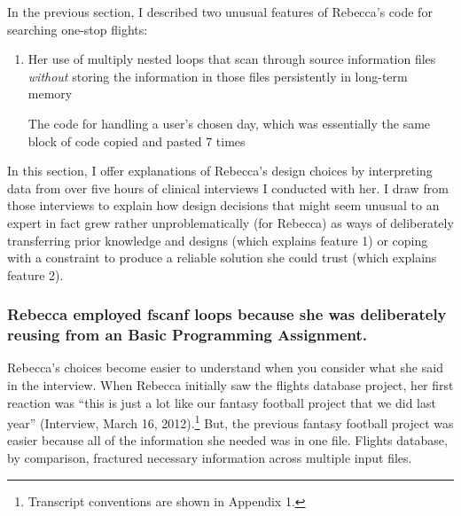 In the previous section, I described two unusual features of Rebecca's code for searching one-stop flights:

\begin{enumerate}
\def\labelenumi{\arabic{enumi}.}
\item
  Her use of multiply nested loops that scan through source information files \emph{without} storing the information in those files persistently in long-term memory

  The code for handling a user's chosen day, which was essentially the same block of code copied and pasted 7 times
\end{enumerate}

In this section, I offer explanations of Rebecca's design choices by interpreting data from over five hours of clinical interviews I conducted with her. I draw from those interviews to explain how design decisions that might seem unusual to an expert in fact grew rather unproblematically (for Rebecca) as ways of deliberately transferring prior knowledge and designs (which explains feature 1) or coping with a constraint to produce a reliable solution she could trust (which explains feature 2).

\subsubsection{Rebecca employed fscanf loops because she was deliberately reusing from an Basic Programming Assignment.}\label{rebecca-employed-fscanf-loops-because-she-was-deliberately-reusing-from-an-basic-programming-assignment.}

Rebecca's choices become easier to understand when you consider what she said in the interview. When Rebecca initially saw the flights database project, her first reaction was ``this is just a lot like our fantasy football project that we did last year'' (Interview, March 16, 2012).\footnote{Transcript conventions are shown in Appendix 1.} But, the previous fantasy football project was easier because all of the information she needed was in one file. Flights database, by comparison, fractured necessary information across multiple input files.

